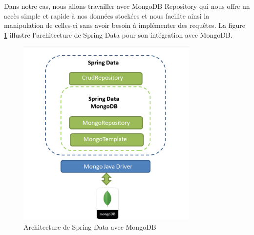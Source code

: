Dans notre cas, nous allons travailler avec MongoDB Repository qui nous offre un acc\`es simple et rapide \`a nos donn\'ees stock\'ees et nous facilite ainsi la manipulation de celles-ci sans avoir besoin \`a impl\'ementer des requ\^etes. La figure \ref{fig:architecture_springdata}  
\cite{nosql} illustre l'architecture de Spring Data pour son int\'egration avec MongoDB.
\begin{figure}[!ht]\centering
\includegraphics[width=0.8\textwidth]{chapitres/chapitrex/figures/SpringData.png}
\caption{Architecture de Spring Data avec MongoDB}
\label{fig:architecture_springdata}
\end{figure}

